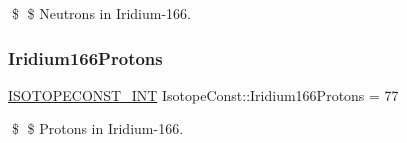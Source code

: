 \$ \$ Neutrons in Iridium-\/166. \mbox{\label{group___isotope_const-_iridium-_ir166_ga27e73435479f7d939e48a565a523d02d}} 
\subsubsection{\texorpdfstring{Iridium166\+Protons}{Iridium166Protons}}
{\footnotesize\ttfamily \mbox{\hyperlink{group___isotope_const-_macros_ga5f18360b3e99483a35c32d789e62621c}{I\+S\+O\+T\+O\+P\+E\+C\+O\+N\+S\+T\+\_\+\+I\+NT}} Isotope\+Const\+::\+Iridium166\+Protons = 77}

\$ \$ Protons in Iridium-\/166. 